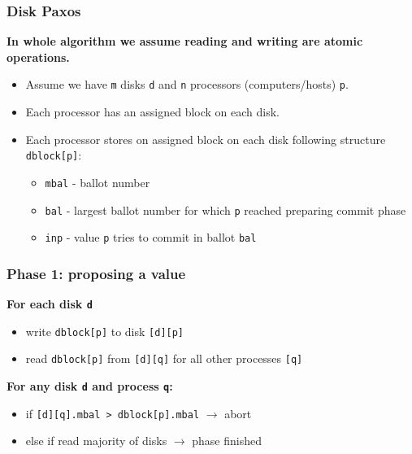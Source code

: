 \documentclass[10pt,utf8]{beamer}
\begin{document}
\begin{frame}
    \frametitle{Disk Paxos}
    \centering
    \textbf{In whole algorithm we assume reading and writing are atomic operations.}\\
    \vspace{1cm}
    
    \begin{itemize}
     \item Assume we have \texttt{m} disks \texttt{d} and \texttt{n} processors (computers/hosts) \texttt{p}.
     \item Each processor has an assigned block on each disk.
     \item Each processor stores on assigned block on each disk following structure \texttt{dblock[p]}:
     \begin{itemize}
        \item \texttt{mbal} - ballot number
        \item \texttt{bal} - largest ballot number for which \texttt{p} reached preparing commit phase
        \item \texttt{inp} - value \texttt{p} tries to commit in ballot \texttt{bal}
     \end{itemize}
    \end{itemize}
\end{frame}


\begin{frame}
    \frametitle{Phase 1: proposing a value}
    \centering
    \textbf{For each disk \texttt{d}}
    \vspace{0.5cm}
    \begin{itemize}
        \item write \texttt{dblock[p]} to disk \texttt{[d][p]}
        \item read \texttt{dblock[p]} from \texttt{[d][q]} for all other processes \texttt{[q]}
    \end{itemize}
    
    \vspace{1cm}
    
    \centering
    \textbf{For any disk \texttt{d} and process \texttt{q}:}
    \vspace{0.5cm}
    \begin{itemize}
        \item if \texttt{[d][q].mbal > dblock[p].mbal} $\rightarrow$ abort
        \item else if read majority of disks $\rightarrow$ phase finished
    \end{itemize}
\end{frame}
\end{document}
